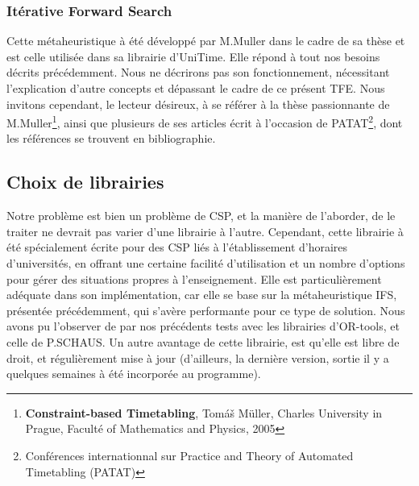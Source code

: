 \subsubsection{Itérative Forward Search}
Cette métaheuristique à été développé par M.Muller dans le cadre de sa thèse et est celle utilisée dans sa librairie d'UniTime. 
Elle répond à tout nos besoins décrits précédemment. Nous ne décrirons pas son fonctionnement, 
nécessitant l'explication d'autre concepts et dépassant le cadre de ce présent TFE. Nous invitons cependant, le lecteur désireux, à se référer à la thèse passionnante de M.Muller\footnote{\textbf{Constraint-based Timetabling}, Tomáš Müller, Charles University in Prague, Faculté of Mathematics and Physics, 2005}, ainsi que plusieurs de ses articles écrit à l'occasion de PATAT\footnote{Conférences internationnal sur Practice and Theory of Automated Timetabling (PATAT)}, dont les références se trouvent en bibliographie.


\subsection{Choix de librairies}
Notre problème est bien un problème de CSP, et la manière de l'aborder, de le traiter ne devrait pas varier d'une librairie à l'autre. Cependant, cette librairie à été spécialement écrite pour des CSP liés à l'établissement d'horaires d'universités, en offrant une certaine facilité d'utilisation et un nombre d'options pour gérer des situations propres à l'enseignement.
Elle est particulièrement adéquate dans son implémentation, car elle se base sur la métaheuristique IFS, présentée précédemment, qui s'avère performante pour ce type de solution.  Nous avons pu l'observer de par nos précédents tests avec les librairies d'OR-tools, et celle de P.SCHAUS.
\newline
\indent
Un autre avantage de cette librairie, est qu'elle est libre de droit, et régulièrement mise à jour (d'ailleurs, la dernière version, sortie il y a quelques semaines à été incorporée au programme).


